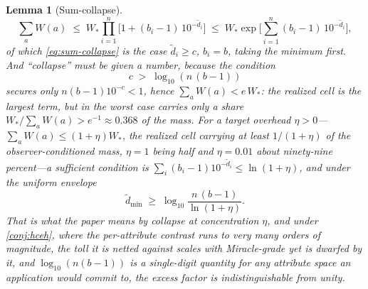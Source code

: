 \documentclass[11pt]{article}
\newtheorem{lemma}{Lemma}
\theoremstyle{definition}
\begin{document}
\begin{lemma}[Sum-collapse]
\begin{equation}
\label{eq:hetero-collapse}
\sum_a W(a) \;\le\; W_\ast \prod_{i=1}^{n}\Big[1 + (b_i - 1)\,10^{-\tilde d_i}\Big] \;\le\; W_\ast \exp\!\Big[\sum_{i=1}^{n} (b_i - 1)\,10^{-\tilde d_i}\Big],
\end{equation}
of which \eqref{eq:sum-collapse} is the case $\tilde d_i \ge c$, $b_i = b$, taking the minimum first. And ``collapse'' must be given a number, because the condition
\begin{equation}
\label{eq:collapse-condition}
c \;>\; \log_{10}\!\left( n\,(b-1) \right)
\end{equation}
secures only $n(b-1)10^{-c} < 1$, hence $\sum_a W(a) < e\,W_\ast$: the realized cell is the largest term, but in the worst case carries only a share $W_\ast / \sum_a W(a) > e^{-1} \approx 0.368$ of the mass. For a target overhead $\eta > 0$---$\sum_a W(a) \le (1 + \eta) W_\ast$, the realized cell carrying at least $1/(1+\eta)$ of the observer-conditioned mass, $\eta = 1$ being half and $\eta = 0.01$ about ninety-nine percent---a sufficient condition is $\sum_i (b_i - 1) 10^{-\tilde d_i} \le \ln(1 + \eta)$, and under the uniform envelope
\begin{equation}
\label{eq:collapse-eta}
\tilde d_{\min} \;\ge\; \log_{10}\frac{n\,(b-1)}{\ln(1+\eta)}.
\end{equation}
That is what the paper means by collapse at concentration $\eta$, and under \autoref{conj:hceh}, where the per-attribute contrast runs to very many orders of magnitude, the toll it is netted against scales with Miracle-grade yet is dwarfed by it, and $\log_{10}(n(b-1))$ is a single-digit quantity for any attribute space an application would commit to, the excess factor is indistinguishable from unity.
\end{lemma}
\end{document}
